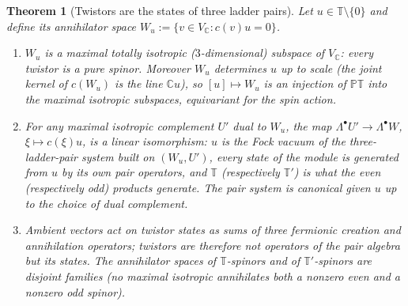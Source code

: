 \documentclass[11pt]{article}
\newtheorem{theorem}{Theorem}[section]
\theoremstyle{definition}
\newcommand{\C}{\mathbb{C}}
\newcommand{\T}{\mathbb{T}}
\newcommand{\PT}{\mathbb{PT}}
\begin{document}
\begin{theorem}[Twistors are the states of three ladder pairs]\label{thm:states}
Let $u \in \T\setminus\{0\}$ and define its \emph{annihilator space} $W_u := \{v \in V_\C : c(v)u = 0\}$.
\begin{enumerate}
\item $W_u$ is a maximal totally isotropic ($3$-dimensional) subspace of $V_\C$: \emph{every} twistor is a pure spinor. Moreover $W_u$ determines $u$ up to scale (the joint kernel of $c(W_u)$ is the line $\C u$), so $[u] \mapsto W_u$ is an injection of $\PT$ into the maximal isotropic subspaces, equivariant for the spin action.
\item For any maximal isotropic complement $U'$ dual to $W_u$, the map $\Lambda^\bullet U' \to \Lambda^\bullet W$, $\xi \mapsto c(\xi)u$, is a linear isomorphism: $u$ is the Fock vacuum of the three-ladder-pair system built on $(W_u, U')$, every state of the module is generated from $u$ by its own pair operators, and $\T$ (respectively $\T'$) is what the even (respectively odd) products generate. The pair system is canonical given $u$ up to the choice of dual complement.
\item Ambient vectors act on twistor states as sums of three fermionic creation and annihilation operators; twistors are therefore not \emph{operators} of the pair algebra but its \emph{states}. The annihilator spaces of $\T$-spinors and of $\T'$-spinors are disjoint families (no maximal isotropic annihilates both a nonzero even and a nonzero odd spinor).
\end{enumerate}
\end{theorem}
\end{document}
